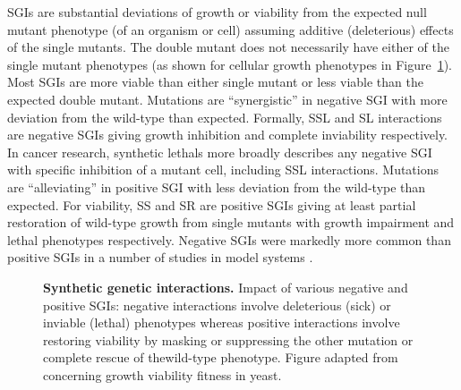 \glspl{SGI} are substantial deviations of growth or viability from the expected null \gls{mutant} phenotype (of an organism or cell) assuming additive (deleterious) effects of the single \glspl{mutant}. The double \gls{mutant} does not necessarily have either of the single \gls{mutant} phenotypes (as shown for cellular growth phenotypes in Figure~\ref{fig:Costanzo2011}). Most \glspl{SGI} are more viable than either single \gls{mutant} or less viable than the expected double \gls{mutant}. Mutations are ``synergistic'' in negative \gls{SGI} with more deviation from the \gls{wild-type} than expected. Formally, \gls{SSL} and \gls{SL} interactions are negative \glspl{SGI} giving growth inhibition and complete inviability respectively. In cancer research, \glspl{synthetic lethal} more broadly describes any negative \gls{SGI} with specific inhibition of a \gls{mutant} cell, including \gls{SSL} interactions. Mutations are ``alleviating'' in positive \gls{SGI} with less deviation from the \gls{wild-type} than expected. For viability, \gls{SS} and \gls{SR} are positive \glspl{SGI} giving at least partial restoration of \gls{wild-type} growth from single \glspl{mutant} with growth impairment and lethal phenotypes respectively. Negative \glspl{SGI} were markedly more common than positive \glspl{SGI} in a number of studies in model systems \citep{Tong2004, Boucher2013}. 

\begin{figure}[!ht]
   \caption[Synthetic genetic interactions]{\small \textbf{Synthetic genetic interactions.} Impact of various negative and positive \glspl{SGI}: negative interactions involve deleterious (sick) or inviable (lethal) phenotypes whereas positive interactions involve restoring viability by masking or suppressing the other \gls{mutation} or complete rescue of the\gls{wild-type} phenotype. Figure adapted from \citep{Costanzo2011} concerning growth viability fitness in yeast.}
\label{fig:Costanzo2011}
\end{figure}

